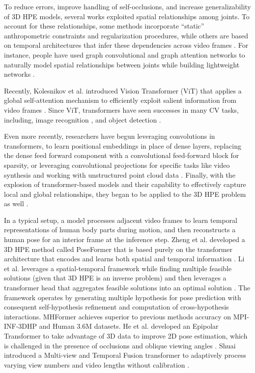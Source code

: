 \documentclass{article}
\begin{document}
To reduce errors, improve handling of self-occlusions, and increase generalizability of 3D HPE models, several works exploited spatial relationships among joints. To account for these relationships, some methods incorporate “static” anthropometric constraints and regularization procedures, while others are based on temporal architectures that infer these dependencies across video frames \cite{DMKASJ18,PFGA19,WYXL20, CFSZCL21}. For instance, people have used graph convolutional and graph attention networks to naturally model spatial relationships between joints while building lightweight networks \cite{VCCRLB18, SDMR20, WHXYS20, BGK21}.


Recently, Kolesnikov et al. introduced Vision Transformer (ViT) that applies a global self-attention mechanism to efficiently exploit salient information from video frames \cite{KDWHUBMDHGUZ21}. Since ViT, transformers have seen successes in many  CV tasks, including, image recognition \cite{KDWHUBMDHGUZ21,YCWYSJTFY21}, and object detection  \cite{CMSUKZ20}.


Even more recently, researchers have begun leveraging convolutions in transformers, to learn positional embeddings in place of dense layers, replacing the dense feed forward component with a convolutional feed-forward block for sparsity, or leveraging convolutional projections for specific tasks like video synthesis and working with unstructured point cloud data  \cite{ZSWJYCL20,CJHR21}. Finally, with the explosion of transformer-based models and their capability to effectively capture local and global relationships, they began to be applied to the 3D HPE problem as well \cite{YRKS20,SWL21, LWL21,ZZMYCD21}.


In a typical setup, a model processes adjacent video frames to learn temporal representations of human body parts during motion, and then reconstructs a human pose for an interior frame at the inference step. Zheng et al. developed a 3D HPE method called PoseFormer that is based purely on the transformer architecture that encodes and learns both spatial and temporal information \cite{ZZMYCD21}. Li et al. leverages a spatial-temporal framework while finding multiple feasible solutions (given that 3D HPE is an inverse problem) and then leverages a transformer head that aggregates feasible solutions into an optimal solution \cite{li2022mhformer}. The framework operates by generating multiple hypothesis for pose prediction with consequent self-hypothesis refinement and computation of cross-hypothesis interactions. MHFormer achieves superior to previous methods accuracy on MPI-INF-3DHP and Human 3.6M datasets. He et al. developed an Epipolar Transformer to take advantage of 3D data to improve 2D pose estimation, which is challenged in the presence of occlusions and oblique viewing angles \cite{YRKS20}. Shuai introduced a Multi-view and Temporal Fusion transformer to adaptively process varying view numbers and video lengths without calibration \cite{SWL21}.
\end{document}
